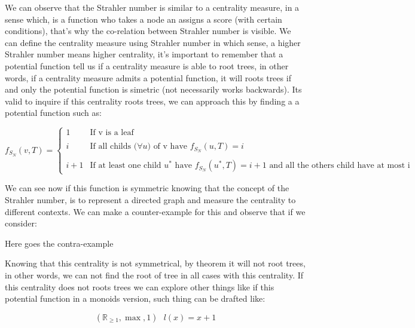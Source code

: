 
We can observe that the Strahler number is similar to a centrality measure, in a sense which, is a function who takes a node an assigns a score (with certain conditions), that's why the co-relation between Strahler number is visible. We can define the centrality measure using Strahler number in which sense, a higher Strahler number means higher centrality, it's important to remember that a potential function tell us if a centrality measure is able to root trees, in other words, if a centrality measure admits a potential function, it will roots trees if and only the potential function is simetric (not necessarily works backwards). Its valid to inquire if this centrality roots trees, we can approach this by finding a a potential function such as:
\begin{center}
    \begin{equation}
        f_{S_{N}} (v,T) = \left\{ \begin{array}{lcc}
             1 &   \text{If v is a leaf}  &\\
             \\ i & \text{If all childs ($\forall u)$ of v have $f_{S_{N}} (u,T) = i$} \\
             \\ i + 1 &  \text{If at least one child $u^{
             *}$ have $f_{S_{N}} (u^{*},T) = i+1$  and all the others child  have at most i} 
             \end{array}
   \right.
    \end{equation}
\end{center}
We can see now if this function is symmetric knowing that the concept of the Strahler number, is to represent a directed graph and measure the centrality to different contexts. We can make a counter-example for this and observe that if we consider:

Here goes the contra-example
\begin{center}
    
\end{center}

Knowing that this centrality is not symmetrical, by theorem it will not root trees, in other words, we can not find the root of tree in all cases with this centrality. If this centrality does not roots trees we can explore other things like if this potential function in a monoids version, such thing can be drafted like:
\begin{center}
    \begin{equation}
        (\mathbb R_{\geq 1},\max,1)                \text{  $l(x) = x + 1$} 
    \end{equation}
\end{center}
